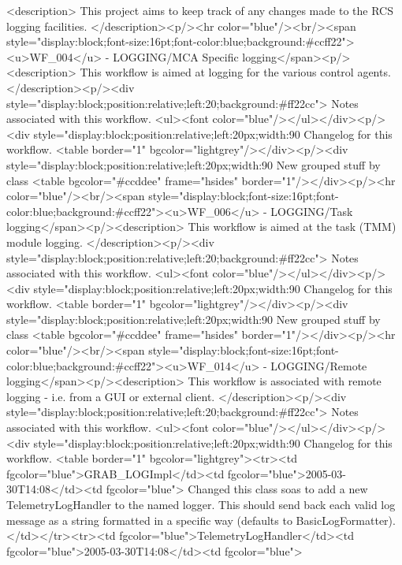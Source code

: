     <description>
      This project aims to keep track of any changes made to the RCS logging facilities.
    </description><p/><hr color="blue"/><br/><span style="display:block;font-size:16pt;font-color:blue;background:#ccff22"><u>WF_004</u> -    LOGGING/MCA Specific logging</span><p/><description>      
	This workflow is aimed at logging for the various control agents.
      </description><p/><div style="display:block;position:relative;left:20;background:#ff22cc">
      Notes associated with this workflow.
      <ul><font color="blue"/></ul></div><p/><div style="display:block;position:relative;left:20px;width:90%
      Changelog for this workflow.
      <table border="1" bgcolor="lightgrey"/></div><p/><div style="display:block;position:relative;left:20px;width:90%
     New grouped stuff by class
     <table bgcolor="#ccddee" frame="hsides" border="1"/></div><p/><hr color="blue"/><br/><span style="display:block;font-size:16pt;font-color:blue;background:#ccff22"><u>WF_006</u> -    LOGGING/Task logging</span><p/><description>
	This workflow is aimed at the task (TMM) module logging.
      </description><p/><div style="display:block;position:relative;left:20;background:#ff22cc">
      Notes associated with this workflow.
      <ul><font color="blue"/></ul></div><p/><div style="display:block;position:relative;left:20px;width:90%
      Changelog for this workflow.
      <table border="1" bgcolor="lightgrey"/></div><p/><div style="display:block;position:relative;left:20px;width:90%
     New grouped stuff by class
     <table bgcolor="#ccddee" frame="hsides" border="1"/></div><p/><hr color="blue"/><br/><span style="display:block;font-size:16pt;font-color:blue;background:#ccff22"><u>WF_014</u> -    LOGGING/Remote logging</span><p/><description>
	This workflow is associated with remote logging - i.e. from a GUI or external client.
     </description><p/><div style="display:block;position:relative;left:20;background:#ff22cc">
      Notes associated with this workflow.
      <ul><font color="blue"/></ul></div><p/><div style="display:block;position:relative;left:20px;width:90%
      Changelog for this workflow.
      <table border="1" bgcolor="lightgrey"><tr><td fgcolor="blue">GRAB_LOGImpl</td><td fgcolor="blue">2005-03-30T14:08</td><td fgcolor="blue">
	    Changed this class soas to add a new TelemetryLogHandler to the named logger. This should send
	    back each valid log message as a string formatted in a specific way (defaults to BasicLogFormatter).
	  </td></tr><tr><td fgcolor="blue">TelemetryLogHandler</td><td fgcolor="blue">2005-03-30T14:08</td><td fgcolor="blue">
